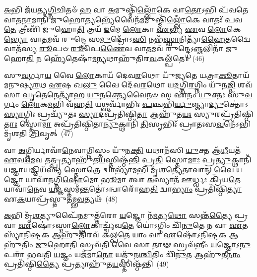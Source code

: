 \-\ul{𑌅}\-𑌭𑌿 𑌜᳴𑌯𑌤𑍍𑌯\-\ul{𑌗𑍍𑌨𑌿}\-𑌚𑌿𑌤𑍞᳴ \ul{𑌹} 𑌵𑌾 \ul{𑌅}\-𑌮𑍁𑌷𑍍𑌮𑌿᳴\-\ul{𑌲𑍍𑌲𑍋𑌁}\-𑌕𑍇 𑌵𑌾\-\ul{𑌤𑍋}\-\-𑌽𑌭𑌿 𑌪᳴𑌵𑌤𑍇 𑌵𑌾𑌤\-\ul{𑌨𑌾}\-𑌮𑌾𑌨𑌿᳴ 𑌜𑍁𑌹𑍋\-\ul{𑌤𑍍𑌯}\-𑌭𑍍𑌯𑍇᳴𑌵𑍈𑌨᳴\-\ul{𑌮}\-𑌮𑍁𑌷𑍍𑌮𑌿᳴\-\ul{𑌲𑍍𑌲𑍋𑌁}\-𑌕𑍇 𑌵𑌾𑌤𑌃᳴ 𑌪𑌵\-\ul{𑌤𑍇} 𑌤𑍍𑌰𑍀𑌣𑌿᳴ 𑌜𑍁𑌹𑍋\-\ul{𑌤𑌿} 𑌤𑍍𑌰𑌯᳴ \ul{𑌇}\-𑌮𑍇 \ul{𑌲𑍋}\-𑌕𑌾 \ul{𑌏}\-𑌭𑍍𑌯 \ul{𑌏}\-𑌵 \ul{𑌲𑍋}\-𑌕𑍇\-\ul{𑌭𑍍𑌯𑍋} 𑌵𑌾\-\ul{𑌤}\-𑌮𑌵᳴ 𑌰𑍁𑌨𑍍𑌦𑍍𑌧𑍇 𑌸\-\ul{𑌮𑍁}\-𑌦𑍍𑌰𑍋᳴\-𑌽\-\ul{𑌸𑌿} 𑌨𑌭᳴\-\ul{𑌸𑍍𑌵𑌾}\-𑌨𑌿𑌤𑍍𑌯𑌾᳴\-\ul{𑌹𑍈}\-𑌤𑌦𑍍𑌵𑍈 𑌵𑌾𑌤᳴𑌸𑍍𑌯 \ul{𑌰𑍂}\-𑌪𑍞 \ul{𑌰𑍂}\-𑌪𑍇\-\ul{𑌣𑍈}\-𑌵 𑌵𑌾\-\ul{𑌤}\-𑌮𑌵᳴ 𑌰𑍁𑌨𑍍𑌦𑍍𑌧𑍇\-𑌽\-\ul{𑌞𑍍𑌜}\-𑌲𑌿𑌨𑌾᳴ 𑌜𑍁𑌹𑍋\-\ul{𑌤𑌿} 𑌨 𑌹𑍍𑌯𑍇᳴𑌤𑍇𑌷𑌾᳴\-\ul{𑌮}\-𑌨𑍍𑌯𑌥𑌾𑌹𑍁᳴𑌤𑌿𑌰\-\ul{𑌵}\-𑌕𑌲𑍍𑌪᳴𑌤𑍇॥~(46)

{\anuvakamend[{𑌓𑌷᳴𑌧𑌯𑌃 \ul{𑌸}\-𑌪𑍍𑌤𑌾𑌭𑌿 𑌦𑌿\-\ul{𑌶𑍋}\-\-𑌽𑌨𑍍𑌯\-\ul{𑌥𑌾} 𑌦𑍍𑌵𑍇 𑌚᳴}]}%

𑌸𑍁\-\ul{𑌵}\-𑌰𑍍𑌗𑌾\-\ul{𑌯} 𑌵𑍈 \ul{𑌲𑍋}\-𑌕𑌾𑌯᳴ 𑌦𑍇𑌵\-\ul{𑌰}\-𑌥𑍋 𑌯𑍁᳴𑌜𑍍𑌯𑌤𑍇 𑌯𑌤𑍍𑌰𑌾\-\ul{𑌕𑍂}\-𑌤𑌾𑌯᳴ 𑌮𑌨𑍁𑌷𑍍𑌯\-\ul{𑌰}\-𑌥 \ul{𑌏}\-𑌷 𑌖\-\ul{𑌲𑍁} 𑌵𑍈 𑌦𑍇᳴𑌵\-\ul{𑌰}\-𑌥𑍋 𑌯\-\ul{𑌦}\-𑌗𑍍𑌨𑌿\-\ul{𑌰}\-𑌗𑍍𑌨𑌿𑌂 𑌯𑍁᳴𑌨\-\ul{𑌜𑍍𑌮𑌿} 𑌶𑌵᳴𑌸𑌾 \ul{𑌘𑍃}\-𑌤𑍇𑌨𑍇𑌤𑍍𑌯𑌾᳴𑌹 \ul{𑌯𑍁}\-𑌨\-\ul{𑌕𑍍𑌤𑍍𑌯𑍇}\-𑌵𑍈\-\ul{𑌨}\-\-\ul{𑍞} 𑌸 𑌏᳴𑌨𑌂 \ul{𑌯𑍁}\-𑌕𑍍𑌤𑌃 𑌸𑍁᳴\-\ul{𑌵}\-𑌰𑍍𑌗𑌂 \ul{𑌲𑍋}\-𑌕\-\ul{𑌮}\-𑌭𑌿 𑌵᳴𑌹\-\ul{𑌤𑌿} 𑌯𑌥𑍍𑌸𑌰𑍍𑌵𑌾᳴𑌭𑌿𑌃 \ul{𑌪}\-𑌞𑍍𑌚𑌭𑌿᳴\-\ul{𑌰𑍍𑌯𑍁}\-𑌞𑍍𑌜𑍍𑌯𑌾\-\ul{𑌦𑍍𑌯𑍁}\-𑌕𑍍𑌤𑍋॑\-𑌽\-\ul{𑌸𑍍𑌯𑌾}\-𑌗𑍍𑌨𑌿𑌃 𑌪𑍍𑌰𑌚𑍍𑌯𑍁᳴𑌤𑌃 \ul{𑌸𑍍𑌯𑌾}\-𑌦𑌪𑍍𑌰᳴𑌤𑌿𑌷𑍍𑌠𑌿\-\ul{𑌤𑌾} 𑌆𑌹𑍁᳴𑌤\-\ul{𑌯𑌃} 𑌸𑍍𑌯𑍁𑌰𑌪𑍍𑌰᳴𑌤𑌿𑌷𑍍𑌠𑌿\-\ul{𑌤𑌾𑌃} 𑌸𑍍𑌤𑍋\-\ul{𑌮𑌾} 𑌅𑌪𑍍𑌰᳴𑌤𑌿𑌷𑍍𑌠𑌿𑌤𑌾\-\ul{𑌨𑍍𑌯𑍁}\-𑌕𑍍𑌥𑌾𑌨𑌿᳴ \ul{𑌤𑌿}\-𑌸𑍃𑌭𑌿𑌃᳴ 𑌪𑍍𑌰𑌾𑌤𑌃𑌸\-\ul{𑌵}\-𑌨𑍇᳴\-𑌽𑌭𑌿 𑌮𑍃᳴𑌶𑌤𑌿 \ul{𑌤𑍍𑌰𑌿}\-𑌵𑍃𑌤𑍍~(47)

𑌵𑌾 \ul{𑌅}\-𑌗𑍍𑌨𑌿𑌰𑍍𑌯𑌾𑌵𑌾᳴\-\ul{𑌨𑍇}\-𑌵𑌾𑌗𑍍𑌨𑌿𑌸𑍍𑌤𑌂 𑌯𑍁᳴𑌨\-\ul{𑌕𑍍𑌤𑌿} 𑌯𑌥𑌾𑌨᳴𑌸𑌿 \ul{𑌯𑍁}\-𑌕𑍍𑌤 𑌆᳴\-\ul{𑌧𑍀}\-𑌯𑌤᳴ \ul{𑌏}\-𑌵\-\ul{𑌮𑍇}\-𑌵 𑌤𑌤𑍍𑌪𑍍𑌰𑌤𑍍𑌯𑌾𑌹𑍁᳴𑌤\-\ul{𑌯}\-𑌸𑍍𑌤𑌿𑌷𑍍𑌠᳴\-\ul{𑌨𑍍𑌤𑌿} 𑌪𑍍𑌰\-\ul{𑌤𑌿} 𑌸𑍍𑌤𑍋\-\ul{𑌮𑌾𑌃} 𑌪𑍍𑌰\-\ul{𑌤𑍍𑌯𑍁}\-𑌕𑍍𑌥𑌾𑌨𑌿᳴ 𑌯𑌜𑍍𑌞𑌾\-\ul{𑌯}\-𑌜𑍍𑌞𑌿𑌯᳴𑌸𑍍𑌯 \ul{𑌸𑍍𑌤𑍋}\-𑌤𑍍𑌰𑍇 𑌦𑍍𑌵𑌾𑌭𑍍𑌯𑌾᳴\-\ul{𑌮}\-𑌭𑌿 𑌮𑍃᳴𑌶\-\ul{𑌤𑍍𑌯𑍇}\-𑌤𑌾\-\ul{𑌵𑌾}\-𑌨𑍍 𑌵𑍈 \ul{𑌯}\-𑌜𑍍𑌞𑍋 𑌯𑌾𑌵𑌾᳴𑌨𑌗𑍍𑌨𑌿\-\ul{𑌷𑍍𑌟𑍋}\-𑌮𑍋 \ul{𑌭𑍂}\-𑌮𑌾 𑌤𑍍𑌵𑌾 \ul{𑌅}\-𑌸𑍍𑌯𑌾𑌤᳴ \ul{𑌊}\-𑌰𑍍𑌧𑍍𑌵𑌃 𑌕𑍍𑌰𑌿᳴𑌯\-\ul{𑌤𑍇} 𑌯𑌾𑌵𑌾᳴\-\ul{𑌨𑍇}\-𑌵 \ul{𑌯}\-𑌜𑍍𑌞𑌸𑍍𑌤𑌮᳴\-\ul{𑌨𑍍𑌤}\-𑌤𑍋॑\-𑌽𑌨𑍍𑌵𑌾𑌰𑍋᳴𑌹\-\ul{𑌤𑌿} 𑌦𑍍𑌵𑌾\-\ul{𑌭𑍍𑌯𑌾𑌂} 𑌪𑍍𑌰𑌤𑌿᳴𑌷𑍍𑌠𑌿\-\ul{𑌤𑍍𑌯𑌾} 𑌏\-\ul{𑌕}\-𑌯𑌾𑌪𑍍𑌰᳴𑌸𑍍𑌤𑍁\-\ul{𑌤}\-𑌮𑍍𑌭\-\ul{𑌵}\-𑌤𑍍𑌯𑌥᳴~(48)

\-\ul{𑌅}\-𑌭𑌿 𑌮𑍃᳴\-\ul{𑌶}\-𑌤𑍍𑌯𑍁𑌪𑍈᳴\-\ul{𑌨}\-𑌮𑍁𑌤𑍍𑌤᳴𑌰𑍋 \ul{𑌯}\-𑌜𑍍𑌞𑍋 𑌨᳴\-\ul{𑌮}\-𑌤𑍍𑌯\-\ul{𑌥𑍋} 𑌸𑌨𑍍𑌤᳴\-\ul{𑌤𑍍𑌯𑍈} 𑌪𑍍𑌰 𑌵𑌾 \ul{𑌏}\-𑌷𑍋॑\-𑌽𑌸𑍍𑌮𑌾\-\ul{𑌲𑍍𑌲𑍋}\-𑌕𑌾𑌚𑍍𑌚𑍍𑌯᳴𑌵\-\ul{𑌤𑍇} 𑌯𑍋॑\-𑌽𑌗𑍍𑌨𑌿𑌂 𑌚𑌿᳴\-\ul{𑌨𑍁}\-𑌤𑍇 𑌨 𑌵𑌾 \ul{𑌏}\-𑌤𑌸𑍍𑌯𑌾᳴𑌨𑌿\-\ul{𑌷𑍍𑌟}\-𑌕 𑌆𑌹𑍁᳴\-\ul{𑌤𑌿}\-𑌰𑌵᳴ 𑌕𑌲𑍍𑌪\-\ul{𑌤𑍇} 𑌯𑌾𑌂 𑌵𑌾 \ul{𑌏}\-𑌷𑍋᳴\-𑌽𑌨𑌿\-\ul{𑌷𑍍𑌟}\-𑌕 𑌆𑌹𑍁᳴𑌤𑌿𑌂 \ul{𑌜𑍁}\-𑌹𑍋\-\ul{𑌤𑌿} 𑌸𑍍𑌰𑌵᳴\-\ul{𑌤𑌿} 𑌵𑍈 𑌸𑌾 𑌤𑌾𑍟 𑌸𑍍𑌰𑌵᳴𑌨𑍍𑌤𑍀𑌂 \ul{𑌯}\-𑌜𑍍𑌞𑍋\-𑌽\-\ul{𑌨𑍁} 𑌪𑌰𑌾᳴ 𑌭𑌵𑌤𑌿 \ul{𑌯}\-𑌜𑍍𑌞𑌂 𑌯𑌜᳴𑌮𑌾\-\ul{𑌨𑍋} 𑌯𑌤𑍍𑌪𑍁᳴𑌨\-\ul{𑌶𑍍𑌚𑌿}\-𑌤𑌿𑌂 𑌚𑌿᳴\-\ul{𑌨𑍁}\-𑌤 𑌆𑌹𑍁᳴𑌤𑍀\-\ul{𑌨𑌾𑌂} 𑌪𑍍𑌰𑌤𑌿᳴𑌷𑍍𑌠𑌿\-\ul{𑌤𑍍𑌯𑍈} 𑌪𑍍𑌰𑌤𑍍𑌯𑌾𑌹𑍁᳴𑌤\-\ul{𑌯}\-𑌸𑍍𑌤𑌿𑌷𑍍𑌠᳴𑌨𑍍𑌤𑌿~(49)

